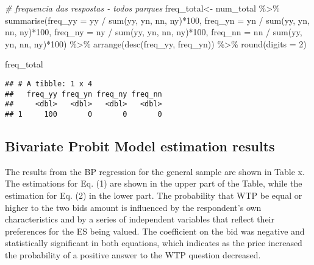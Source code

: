 \documentclass[
]{article}
\newenvironment{Shaded}{\begin{snugshade}}{\end{snugshade}}
\newcommand{\AttributeTok}[1]{\textcolor[rgb]{0.77,0.63,0.00}{#1}}
\newcommand{\CommentTok}[1]{\textcolor[rgb]{0.56,0.35,0.01}{\textit{#1}}}
\newcommand{\DecValTok}[1]{\textcolor[rgb]{0.00,0.00,0.81}{#1}}
\newcommand{\FunctionTok}[1]{\textcolor[rgb]{0.00,0.00,0.00}{#1}}
\newcommand{\NormalTok}[1]{#1}
\newcommand{\OtherTok}[1]{\textcolor[rgb]{0.56,0.35,0.01}{#1}}
\newcommand{\SpecialCharTok}[1]{\textcolor[rgb]{0.00,0.00,0.00}{#1}}
\begin{document}
\begin{Shaded}
\begin{Highlighting}[]
\CommentTok{\# frequencia das respostas {-} todos parques}
\NormalTok{freq\_total}\OtherTok{\textless{}{-}}\NormalTok{ num\_total }\SpecialCharTok{\%\textgreater{}\%}  
  \FunctionTok{summarise}\NormalTok{(}\AttributeTok{freq\_yy =}\NormalTok{ yy }\SpecialCharTok{/} \FunctionTok{sum}\NormalTok{(yy, yn, nn, ny)}\SpecialCharTok{*}\DecValTok{100}\NormalTok{,}
            \AttributeTok{freq\_yn =}\NormalTok{ yn }\SpecialCharTok{/} \FunctionTok{sum}\NormalTok{(yy, yn, nn, ny)}\SpecialCharTok{*}\DecValTok{100}\NormalTok{,}
            \AttributeTok{freq\_ny =}\NormalTok{ ny }\SpecialCharTok{/} \FunctionTok{sum}\NormalTok{(yy, yn, nn, ny)}\SpecialCharTok{*}\DecValTok{100}\NormalTok{,}
            \AttributeTok{freq\_nn =}\NormalTok{ nn }\SpecialCharTok{/} \FunctionTok{sum}\NormalTok{(yy, yn, nn, ny)}\SpecialCharTok{*}\DecValTok{100}\NormalTok{) }\SpecialCharTok{\%\textgreater{}\%} 
  \FunctionTok{arrange}\NormalTok{(}\FunctionTok{desc}\NormalTok{(freq\_yy, freq\_yn)) }\SpecialCharTok{\%\textgreater{}\%} 
  \FunctionTok{round}\NormalTok{(}\AttributeTok{digits =} \DecValTok{2}\NormalTok{)}

\NormalTok{freq\_total}
\end{Highlighting}
\end{Shaded}

\begin{verbatim}
## # A tibble: 1 x 4
##   freq_yy freq_yn freq_ny freq_nn
##     <dbl>   <dbl>   <dbl>   <dbl>
## 1     100       0       0       0
\end{verbatim}

\hypertarget{bivariate-probit-model-estimation-results}{%
\subsection{Bivariate Probit Model estimation
results}\label{bivariate-probit-model-estimation-results}}

The results from the BP regression for the general sample are shown in
Table x. The estimations for Eq. (1) are shown in the upper part of the
Table, while the estimation for Eq. (2) in the lower part. The
probability that WTP be equal or higher to the two bids amount is
influenced by the respondent's own characteristics and by a series of
independent variables that reflect their preferences for the ES being
valued. The coefficient on the bid was negative and statistically
significant in both equations, which indicates as the price increased
the probability of a positive answer to the WTP question decreased.
\end{document}
